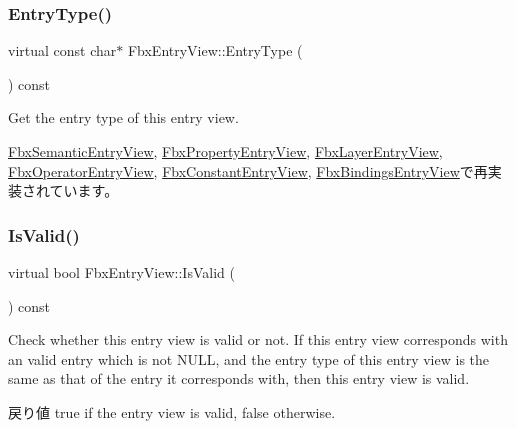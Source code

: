 \subsubsection{\texorpdfstring{Entry\+Type()}{EntryType()}}
{\footnotesize\ttfamily virtual const char$\ast$ Fbx\+Entry\+View\+::\+Entry\+Type (\begin{DoxyParamCaption}{ }\end{DoxyParamCaption}) const\hspace{0.3cm}{\ttfamily [virtual]}}

Get the entry type of this entry view. 

\hyperlink{class_fbx_semantic_entry_view_afd242ecac3eaab584dffe108753aba1d}{Fbx\+Semantic\+Entry\+View}, \hyperlink{class_fbx_property_entry_view_a36affcd0bce8be2a4b5f94ccd60fa462}{Fbx\+Property\+Entry\+View}, \hyperlink{class_fbx_layer_entry_view_a283d8f57e186dd36c88589dc3f37a35e}{Fbx\+Layer\+Entry\+View}, \hyperlink{class_fbx_operator_entry_view_a7821c1bf43a30e4c8ba054c66f051ad0}{Fbx\+Operator\+Entry\+View}, \hyperlink{class_fbx_constant_entry_view_a7ea7fc9df5e1316854d18ffcc797e564}{Fbx\+Constant\+Entry\+View}, \hyperlink{class_fbx_bindings_entry_view_a25f821ea63f19592173e7785356c04f9}{Fbx\+Bindings\+Entry\+View}で再実装されています。

\mbox{\label{class_fbx_entry_view_a6bbdad937ef02ffbacd343fd71ed85d7}} 
\subsubsection{\texorpdfstring{Is\+Valid()}{IsValid()}}
{\footnotesize\ttfamily virtual bool Fbx\+Entry\+View\+::\+Is\+Valid (\begin{DoxyParamCaption}{ }\end{DoxyParamCaption}) const\hspace{0.3cm}{\ttfamily [virtual]}}

Check whether this entry view is valid or not. If this entry view corresponds with an valid entry which is not N\+U\+LL, and the entry type of this entry view is the same as that of the entry it corresponds with, then this entry view is valid. \begin{DoxyReturn}{戻り値}
{\ttfamily true} if the entry view is valid, {\ttfamily false} otherwise. 
\end{DoxyReturn}



